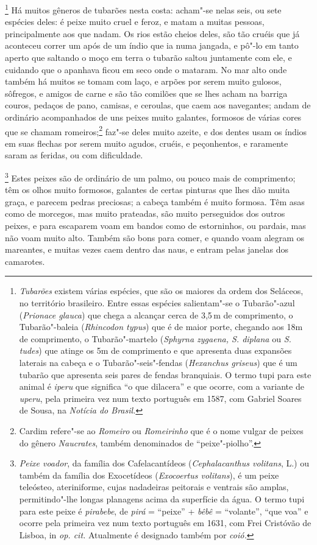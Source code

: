 \footnote{ \textit{Tubarões} existem várias
espécies, que são os maiores da ordem dos Seláceos, no território
brasileiro. Entre essas espécies salientam"-se o Tubarão"-azul
(\textit{Prionace glauca}) que chega a alcançar cerca de 3,5\,m de
comprimento, o Tubarão"-baleia (\textit{Rhincodon typus}) que é de
maior porte, chegando aos 18m de comprimento, o Tubarão"-martelo
(\textit{Sphyrna zygaena, S. diplana} ou \textit{S. tudes}) que
atinge os 5m de comprimento e que apresenta duas expansões laterais
na cabeça e o Tubarão"-seis"-fendas (\textit{Hexanchus griseus}) que é
um tubarão que apresenta seis pares de fendas branquiais. O termo tupi
para este animal é \textit{iperu} que significa ``o que dilacera'' e
que ocorre, com a variante de \textit{uperu}, pela primeira vez num
texto português em 1587, com Gabriel Soares de Sousa, na
\textit{Notícia do Brasil.}} Há muitos gêneros de tubarões
nesta costa: acham"-se nelas seis, ou sete espécies deles: é peixe muito
cruel e feroz, e matam a muitas pessoas, principalmente aos que nadam.
Os rios estão cheios deles, são tão cruéis que já aconteceu correr um
após de um índio que ia numa jangada, e pô"-lo em tanto aperto que
saltando o moço em terra o tubarão saltou juntamente com ele, e
cuidando que o apanhava ficou em seco onde o mataram. No mar alto onde
também há muitos se tomam com laço, e arpões por serem muito gulosos,
sôfregos, e amigos de carne e são tão comilões que se lhes acham na
barriga couros, pedaços de pano, camisas, e ceroulas, que caem aos
navegantes; andam de ordinário acompanhados de uns peixes muito
galantes, formosos de várias cores que se chamam romeiros;\footnote{ Cardim 
refere"-se ao \textit{Romeiro} ou \textit{Romeirinho} que é o
nome vulgar de peixes do gênero \textit{Naucrates}, também denominados
de ``peixe"-piolho''.} faz"-se deles muito azeite, e dos dentes usam os
índios em suas flechas por serem muito agudos, cruéis, e peçonhentos, e
raramente saram as feridas, ou com dificuldade.

\footnote{ \textit{Peixe voador}, da família dos
Cafelacantídeos (\textit{Cephalacanthus volitans}, L.) ou também da
família dos Exocetídeos (\textit{Exocoertus volitans}), é um peixe
teleósteo, ateriniforme, cujas nadadeiras peitorais e ventrais são
amplas, permitindo"-lhe longas planagens acima da superfície da água. O
termo tupi para este peixe é \textit{pirabebe}, de \textit{pirá} = 
``peixe'' + \textit{bêbê} = ``volante'', ``que voa'' e ocorre pela primeira
vez num texto português em 1631, com Frei Cristóvão de Lisboa, in
\textit{op. cit.} Atualmente é designado também por
\textit{coió.}} Estes peixes são de ordinário de um palmo,
ou pouco mais de comprimento; têm os olhos muito formosos, galantes de
certas pinturas que lhes dão muita graça, e parecem pedras preciosas; a
cabeça também é muito formosa. Têm asas como de morcegos, mas muito
prateadas, são muito perseguidos dos outros peixes, e para escaparem
voam em bandos como de estorninhos, ou pardais, mas não voam muito
alto. Também são bons para comer, e quando voam alegram os mareantes, e
muitas vezes caem dentro das naus, e entram pelas janelas dos
camarotes.

